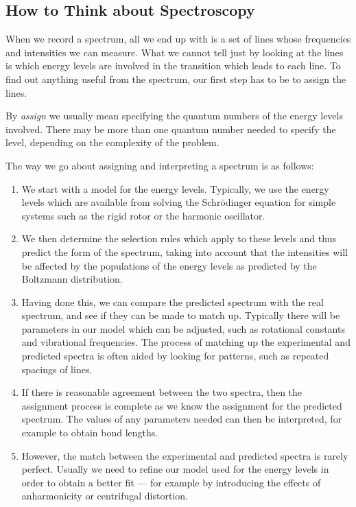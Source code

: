 \documentclass{article}
\theoremstyle{plain}\theoremheaderfont{\normalfont\itshape}\theorembodyfont{\rmfamily}\theoremseparator{.}\newtheorem*{rem}{Remark}\newtheorem*{ex}{Example}\newtheorem*{proof}{Proof}\newtheorem*{altp}{Alternative proof}
\theoremstyle{plain}\theoremheaderfont{\normalfont\bfseries}\theorembodyfont{\rmfamily}\theoremseparator{.}\newtheorem{thm}{Theorem}[section]\newtheorem{lem}[thm]{Lemma}\newtheorem{prop}[thm]{Proposition}\newtheorem*{cor}{Corollary}\newtheorem{defn}[thm]{Definition}\newtheorem{clm}[thm]{Claim}\newtheorem{clminproof}{Claim}\newtheorem{pos}{Postulate}[section]
\theoremstyle{break}\theoremheaderfont{\normalfont\itshape}\theorembodyfont{\rmfamily}\theoremseparator{.\medskip}\newtheorem*{proofskip}{Proof}\newtheorem*{exs}{Examples}\newtheorem*{rems}{Remarks}
\theoremstyle{break}\theoremheaderfont{\normalfont\bfseries}\theorembodyfont{\rmfamily}\theoremseparator{.\medskip}\newtheorem{lemskip}[thm]{Lemma}\newtheorem{defnskip}[thm]{Definition}\newtheorem{propskip}[thm]{Proposition}\newtheorem{thmskip}[thm]{Theorem}
\numberwithin{equation}{section}
\begin{document}
    \subsection{How to Think about Spectroscopy}
    When we record a spectrum, all we end up with is a set of lines whose frequencies and intensities we can measure. What we cannot tell just by looking at the lines is which energy levels are involved in the transition which leads to each line. To find out anything useful from the spectrum, our first step has to be to assign the lines.

    By \textit{assign} we usually mean specifying the quantum numbers of the energy levels involved. There may be more than one quantum number needed to specify the level, depending on the complexity of the problem.

    The way we go about assigning and interpreting a spectrum is as follows:
    \begin{enumerate}[topsep=0pt,label=(\roman*)]
        \item We start with a model for the energy levels. Typically, we use the energy levels which are available from solving the Schr\"{o}dinger equation for simple systems such as the rigid rotor or the harmonic oscillator.
        \item We then determine the selection rules which apply to these levels and thus predict the form of the spectrum, taking into account that the intensities will be affected by the populations of the energy levels as predicted by the Boltzmann distribution.
        \item Having done this, we can compare the predicted spectrum with the real spectrum, and see if they can be made to match up. Typically there will be parameters in our model which can be adjusted, such as rotational constants and vibrational frequencies. The process of matching up the experimental and predicted spectra is often aided by looking for patterns, such as repeated spacings of lines.
        \item If there is reasonable agreement between the two spectra, then the assignment process is complete as we know the assignment for the predicted spectrum. The values of any parameters needed can then be interpreted, for example to obtain bond lengths.
        \item However, the match between the experimental and predicted spectra is rarely perfect. Usually we need to refine our model used for the energy levels in order to obtain a better fit --- for example by introducing the effects of anharmonicity or centrifugal distortion.
    \end{enumerate}
\end{document}
